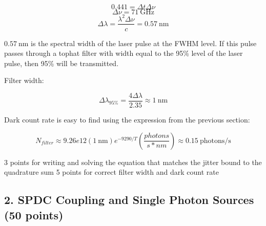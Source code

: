 \documentclass[12pt]{caltech_thesis}
\begin{document}
{\color{midnightblue} 

\[ 0.441 = \Delta t \Delta \nu \] \[\Delta \nu = 71~\text{GHz}\]
\[\Delta \lambda = \frac{\lambda^2 \Delta \nu}{c} = 0.57~\text{nm}\]

}

{\color{midnightblue}  \(0.57~\text{nm}\) is the spectral width of the
laser pulse at the FWHM level. If this pulse passes through a tophat
filter with width equal to the 95\% level of the laser pulse, then 95\%
will be transmitted. }

{\color{midnightblue} Filter width: }

{\color{midnightblue} 

\[\Delta \lambda_{95\%} = \frac{4 \Delta \lambda}{2.35} \approx \boxed{1~\text{nm}} \]

}

{\color{midnightblue} Dark count rate is easy to find using the
expression from the previous section: }

{\color{midnightblue} 

\[\boxed{N_{filter} \approx 9.26e12 (1~\text{nm}) e^{-9290/T} (\frac{photons}{s*nm})} \approx 0.15~\text{photons/s} \]

}

{\color{darkred} 3 points for writing and solving the equation that
matches the jitter bound to the quadrature sum } {\color{darkred} 5
points for correct filter width and dark count rate}

\hypertarget{spdc-coupling-and-single-photon-sources-50-points}{%
\subsection{2. SPDC Coupling and Single Photon Sources (50
points)}\label{spdc-coupling-and-single-photon-sources-50-points}}

\printbibliography
\end{document}
